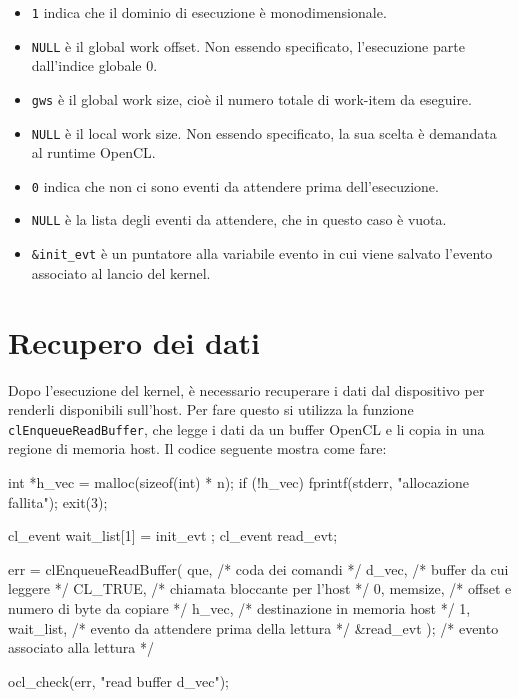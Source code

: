 \begin{itemize}
\begin{itemize}
        \item \texttt{1} indica che il dominio di esecuzione è monodimensionale.
        
        \item \texttt{NULL} è il global work offset. Non essendo specificato, l'esecuzione parte dall'indice globale 0.
        
        \item \texttt{gws} è il global work size, cioè il numero totale di work-item da eseguire.
        
        \item \texttt{NULL} è il local work size. Non essendo specificato, la sua scelta è demandata al runtime OpenCL.
        
        \item \texttt{0} indica che non ci sono eventi da attendere prima dell'esecuzione.
        
        \item \texttt{NULL} è la lista degli eventi da attendere, che in questo caso è vuota.
        
        \item \texttt{\&init\_evt} è un puntatore alla variabile evento in cui viene salvato l'evento associato al lancio del kernel.
    \end{itemize}
\end{itemize}

\section{Recupero dei dati}\label{sec:opencl_basi_retrieval}
Dopo l'esecuzione del kernel, è necessario recuperare i dati dal dispositivo per renderli disponibili sull'host. Per fare questo si utilizza la funzione \texttt{clEnqueueReadBuffer}, che legge i dati da un buffer OpenCL e li copia in una regione di memoria host. Il codice seguente mostra come fare:
\begin{code}[caption={Recupero dei dati da un buffer OpenCL}, label={code:opencl_basi_readbuffer}]
    int *h_vec = malloc(sizeof(int) * n);
    if (!h_vec) {
        fprintf(stderr, "allocazione fallita\n");
        exit(3);
    }

    cl_event wait_list[1] = { init_evt };
    cl_event read_evt;

    err = clEnqueueReadBuffer(
        que,           /* coda dei comandi */
        d_vec,         /* buffer da cui leggere */
        CL_TRUE,       /* chiamata bloccante per l'host */
        0, memsize,    /* offset e numero di byte da copiare */
        h_vec,         /* destinazione in memoria host */
        1, wait_list,  /* evento da attendere prima della lettura */
        &read_evt
    );    /* evento associato alla lettura */

    ocl_check(err, "read buffer d_vec");
\end{code}

